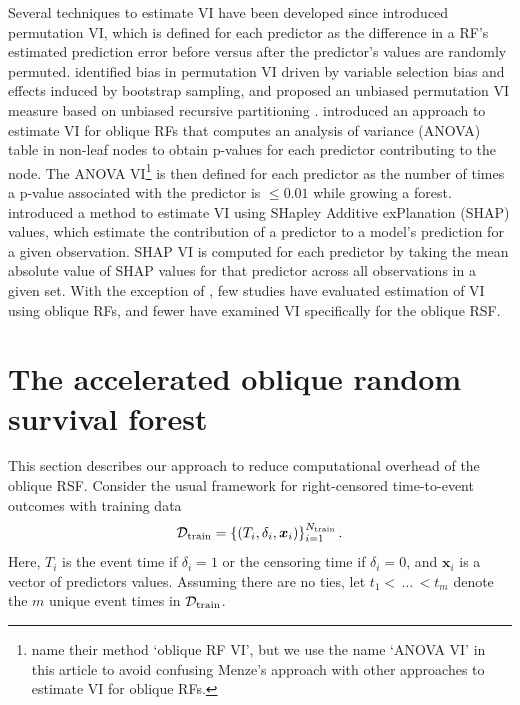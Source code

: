 \documentclass{article}\usepackage[]{graphicx}\usepackage[]{xcolor}
\newcommand{\dataset}{{\cal D}}
\begin{document}
Several techniques to estimate VI have been developed since \citet{breiman2001random} introduced permutation VI, which is defined for each predictor as the difference in a RF's estimated prediction error before versus after the predictor's values are randomly permuted. \citet{strobl2007bias} identified bias in permutation VI driven by variable selection bias and effects induced by bootstrap sampling, and proposed an unbiased permutation VI measure based on unbiased recursive partitioning \citep{hothorn2006unbiased}. \citet{menze2011oblique} introduced an approach to estimate VI for oblique RFs that computes an analysis of variance (ANOVA) table in non-leaf nodes to obtain p-values for each predictor contributing to the node. The ANOVA VI\footnote{\citet{menze2011oblique} name their method `oblique RF VI', but we use the name `ANOVA VI' in this article to avoid confusing Menze's approach with other approaches to estimate VI for oblique RFs.} is then defined for each predictor as the number of times a p-value associated with the predictor is $\leq 0.01$ while growing a forest. \citet{lundberg2017unified} introduced a method to estimate VI using SHapley Additive exPlanation (SHAP) values, which estimate the contribution of a predictor to a model's prediction for a given observation. SHAP VI is computed for each predictor by taking the mean absolute value of SHAP values for that predictor across all observations in a given set. With the exception of \citet{menze2011oblique}, few studies have evaluated estimation of VI using oblique RFs, and fewer have examined VI specifically for the oblique RSF.



\section{The accelerated oblique random survival forest} \label{sec:aorsf}

This section describes our approach to reduce computational overhead of the oblique RSF. Consider the usual framework for right-censored time-to-event outcomes with training data $$\dataset_{\text{train}} = \left\{ (T_i, \delta_i, \bm{x}_{i}) \right\}_{i=1}^{N_{\text{train}}}.$$ Here, $T_i$ is the event time if $\delta_i=1$ or the censoring time if $\delta_i=0$, and $\bm{x}_i$ is a vector of predictors values. Assuming there are no ties, let $t_1 < \, \ldots \, < t_m$ denote the $m$ unique event times in $\dataset_{\text{train}}$.
\end{document}
